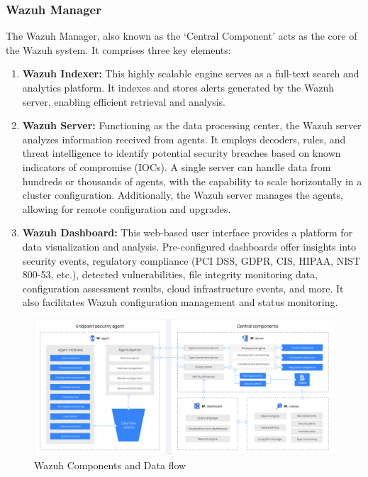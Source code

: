 \subsubsection{Wazuh Manager}

The Wazuh Manager, also known as the `Central Component' acts as the core of the Wazuh system. It comprises three key elements:

\begin{enumerate}
    \item \textbf{Wazuh Indexer:} This highly scalable engine serves as a full-text search and analytics platform. It indexes and stores alerts generated by the Wazuh server, enabling efficient retrieval and analysis.

    \item \textbf{Wazuh Server:} Functioning as the data processing center, the Wazuh server analyzes information received from agents. It employs decoders, rules, and threat intelligence to identify potential security breaches based on known indicators of compromise (IOCs). A single server can handle data from hundreds or thousands of agents, with the capability to scale horizontally in a cluster configuration. Additionally, the Wazuh server manages the agents, allowing for remote configuration and upgrades.

    \item \textbf{Wazuh Dashboard:} This web-based user interface provides a platform for data visualization and analysis. Pre-configured dashboards offer insights into security events, regulatory compliance (PCI DSS, GDPR, CIS, HIPAA, NIST 800-53, etc.), detected vulnerabilities, file integrity monitoring data, configuration assessment results, cloud infrastructure events, and more. It also facilitates Wazuh configuration management and status monitoring.
\end{enumerate}

\begin{figure} [H]
\centering
\includegraphics[width=\textwidth]{images/components-data-flow.png}
\caption{Wazuh Components and Data flow}
\label{fig:wazuhcomponents}
\end{figure}

